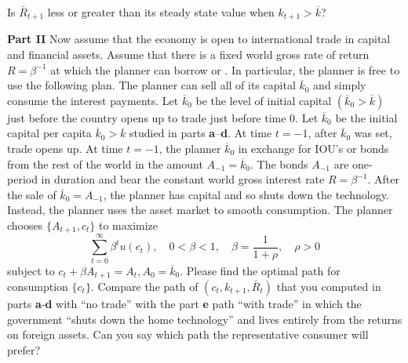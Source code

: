  Is $\bar R_{t+1}$ less or greater than its steady state value when $k_{t+1} > \overline{k}$?

\medskip\noindent
{\bf Part  II}
\medskip
{} Now assume that the economy is open to international trade in capital and financial assets. Assume that there is a fixed world gross rate of return $R=\beta^{-1}$ at which the planner can borrow or .
In particular, the planner is free to use the following plan. The planner can sell all of its capital $\overline{k}_0$ and simply consume the interest payments.
\noindent
Let $\overline{k}_0$ be the level of initial capital $(\overline{k}_0>\overline{k})$ just before the country opens up to trade just before time 0.  Let $\overline{k}_0$ be the initial capital per capita $\overline{k}_0 >\overline{k}$ studied in parts {\bf a}--{\bf d}.
At time $t=-1$, after $\overline{k}_0$ was set, trade opens up. At time $t=-1$, the planner  $\overline{k}_0$ in exchange for IOU's or bonds from the rest of the world in the amount $A_{-1}=\overline{k}_0$.
\medskip \noindent
The bonds $A_{-1}$ are one-period in duration and bear the constant world gross interest rate $R=\beta^{-1}$.
After the sale of $\overline{k}_0=A_{-1}$, the planner has  capital and so shuts down the technology. Instead, the planner uses the asset market to smooth consumption. The planner chooses $\{A_{t+1},c_t\}$ to maximize
$$ \sum_{t=0}^\infty \beta^t u(c_t),  \quad   0< \beta<1,\quad   \beta = {\frac{1}{1+\rho}},  \quad \rho>0$$
subject to
$c_t+\beta A_{t+1}=A_t,  A_0 = \overline{k}_0 .$
Please find the optimal path for consumption $\{c_t\}$.
%
\medskip
{} Compare the path of $(c_t,k_{t+1},\bar R_t)$ that you computed in parts {\bf a}-{\bf d} with ``no trade'' with the part {\bf e} path ``with trade'' in which the government ``shuts down the home technology'' and lives entirely from the returns on foreign assets. Can you say which path the representative consumer will prefer?
